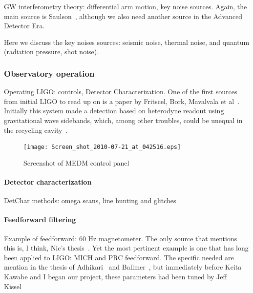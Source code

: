                 GW interferometry theory: differential arm motion, key noise sources. Again, the main source is Saulson~\cite{Saulson}, although we also need another source in the Advanced Detector Era.

                Here we discuss the key noises sources: seismic noise, thermal noise, and quantum (radiation pressure, shot noise).

            \subsubsection{Observatory operation}
            \label{observatory_operation}

                Operating LIGO: controls, Detector Characterization. One of the first sources from initial LIGO to read up on is a paper by Fritscel, Bork, Mavalvala et al~\cite{ReadoutGWA}. Initially this system made a detection based on heterodyne readout using gravitational wave sidebands, which, among other troubles, could be unequal in the recycling cavity~\cite{MeadorsHanford2005}.

	\begin{figure}
	\begin{center}
	\texttt{[image: Screen\_shot\_2010-07-21\_at\_042516.eps]}
	\caption{Screenshot of MEDM control panel}
	\label{ScreenshotMEDM}
	\end{center}
	\end{figure}


                \paragraph{Detector characterization}
                \label{detchar}
            
                    DetChar methods: omega scans, line hunting and glitches

                \paragraph{Feedforward filtering}
                \label{feedforward_filters}

                    Example of feedforward: 60 Hz magnetometer. The only source that mentions this is, I think, Nic's thesis~\cite{SmithThesis}. Yet the most pertinent example is one that has long been applied to LIGO: MICH and PRC feedforward. The specific needed are mention in the thesis of Adhikari~\cite{AdhikariThesis} and Ballmer~\cite{BallmerThesis}, but immediately before Keita Kawabe and I began our project, these parameters had been tuned by Jeff Kissel~\cite{KissellPRCMICH}

